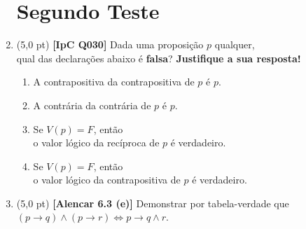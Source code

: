 \documentclass[12pt,a4paper,oneside]{article}
\begin{document}
\begin{enumerate}
	
	\section*{Segundo Teste}
	
	\item (5,0 pt) {\bf [IpC Q030]}	Dada uma proposição $p$ qualquer, \\qual das declarações abaixo é {\bf falsa}? {\bf Justifique a sua resposta!}
	\begin{enumerate}
		\item A contrapositiva da contrapositiva de $p$ é $p$.
		\item A contrária da contrária de $p$ é $p$.
		\item Se $V(p) = F$, então \\o valor lógico da recíproca de $p$ é verdadeiro.
		\item Se $V(p) = F$, então \\o valor lógico da contrapositiva de $p$ é verdadeiro.
	\end{enumerate}
	
	
	\item (5,0 pt) {\bf [Alencar 6.3 (e)]} Demonstrar por tabela-verdade que \\$(p \rightarrow q) \wedge (p \rightarrow r) \Leftrightarrow p \rightarrow q \wedge r$.

\end{enumerate}
\end{document}

